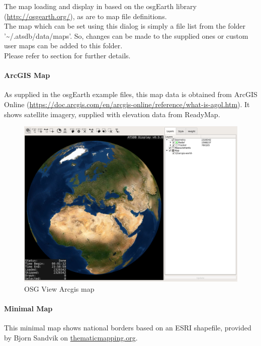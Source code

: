 The map loading and display in based on the osgEarth library (\url{http://osgearth.org/}), as are to map file definitions.  \\

The map which can be set using this dialog is simply a file list from the folder '\textasciitilde/.atsdb/data/maps'. So, changes can be made to the supplied ones or custom user maps can be added to this folder. \\
Please refer to section  for further details.

\newpage
\paragraph{ArcGIS Map}

As supplied in the osgEarth example files, this map data is obtained from ArcGIS Online (\url{https://doc.arcgis.com/en/arcgis-online/reference/what-is-agol.htm}). It shows satellite imagery, supplied with elevation data from ReadyMap. 

\begin{figure}[H]
    \hspace*{-2.5cm}
    \includegraphics[width=19cm,frame]{../screenshots/osgview_arcgis.png}
  \caption{OSG View Arcgis map}
\end{figure}

\newpage
\paragraph{Minimal Map}

This minimal map shows national borders based on an ESRI shapefile, provided by Bjorn Sandvik on \url{thematicmapping.org}.

